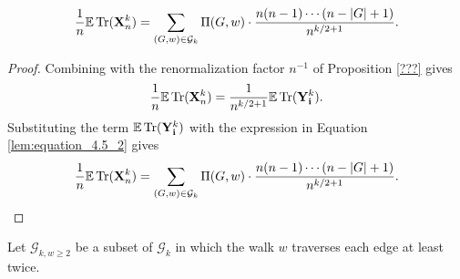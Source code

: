 \begin{lemma}
  \label{lem:equation_4.5_3}
  \[
  \frac{1}{n} \mathbb{E} \operatorname{Tr} (\mathbf{X}_n^k) = \sum_{(G,w) \in \mathcal{G}_k} \Pi (G,w) \cdot \frac{n (n-1) \cdots (n - |G| + 1)}{n^{k/2+1}}.
  \]
\end{lemma}
\begin{proof}
  Combining with the renormalization factor $n^{-1}$ of Proposition \ref{???} gives
  \[
  \frac{1}{n} \mathbb{E} \operatorname{Tr} (\mathbf{X}_n^k) = \frac{1}{n^{k/2+1}} \mathbb{E} \operatorname{Tr} (\mathbf{Y}_\mathbf{i}^k).
  \]
  Substituting the term $\mathbb{E} \operatorname{Tr} (\mathbf{Y}_\mathbf{i}^k)$ with the expression in Equation \ref{lem:equation_4.5_2} gives
  \[
  \frac{1}{n} \mathbb{E} \operatorname{Tr} (\mathbf{X}_n^k) = \sum_{\substack{(G,w) \in \mathcal{G}_k}} \Pi (G,w) \cdot \frac{n (n-1) \cdots (n - |G| + 1)}{n^{k/2+1}}.
  \]
\end{proof}
\begin{definition}
  \label{def:g_k_ge_2}
  Let $\mathcal{G}_{k,w \geq 2}$ be a subset of $\mathcal{G}_k$ in which the walk $w$ traverses each edge at least twice.
\end{definition}
